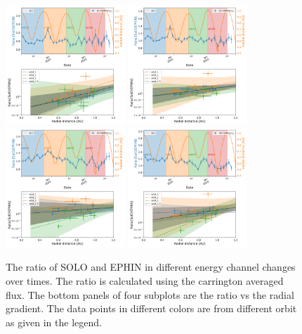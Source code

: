 \begin{figure}
    \centering
    \includegraphics[width =0.4\textwidth]{images/ACR/seperate_mask_1-3/ratio_time_radialgradient_10-20MeV.png}
    \includegraphics[width =0.4\textwidth]{images/ACR/seperate_mask_1-3/ratio_time_radialgradient_20-30MeV.png}
    \includegraphics[width =0.4\textwidth]{images/ACR/seperate_mask_1-3/ratio_time_radialgradient_30-40MeV.png}
    \includegraphics[width =0.4\textwidth]{images/ACR/seperate_mask_1-3/ratio_time_radialgradient_40-50MeV.png}
    \caption{The ratio of SOLO and EPHIN in different energy channel changes over times. The ratio is calculated using the carrington averaged flux. The bottom panels of four subplots are the ratio vs the radial gradient. The data points in different colors are from different orbit as given in the legend.} 

\end{figure}

